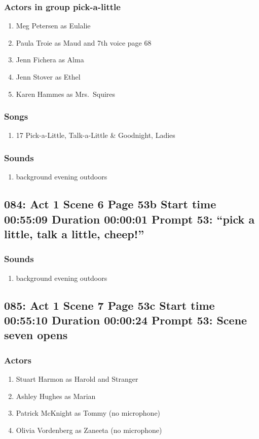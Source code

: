\subsubsection{Actors in group pick-a-little}
\begin{enumerate}
\item Meg Petersen as Eulalie
\item Paula Troie as Maud and 7th voice page 68
\item Jenn Fichera as Alma
\item Jenn Stover as Ethel
\item Karen Hammes as Mrs.~Squires
\end{enumerate}

\subsubsection{Songs}
\begin{enumerate}
\item 17 Pick-a-Little, Talk-a-Little \& Goodnight, Ladies
\end{enumerate}\subsubsection{Sounds}
\begin{enumerate}
\item background evening outdoors
\end{enumerate}
\subsection{084: Act 1 Scene 6 Page 53b Start time 00:55:09 Duration 00:00:01 Prompt 53: ``pick a little, talk a little, cheep!''}
\subsubsection{Sounds}
\begin{enumerate}
\item background evening outdoors
\end{enumerate}
\subsection{085: Act 1 Scene 7 Page 53c Start time 00:55:10 Duration 00:00:24 Prompt 53: Scene seven opens}

\subsubsection{Actors}
\begin{enumerate}
\item Stuart Harmon as Harold and Stranger
\item Ashley Hughes as Marian
\item Patrick McKnight as Tommy (no microphone)
\item Olivia Vordenberg as Zaneeta (no microphone)
\end{enumerate}

